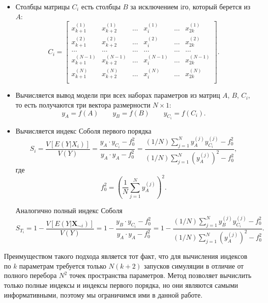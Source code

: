 \documentclass[a4paper,12pt]{article} %
\begin{document}
\begin{itemize}
\item Столбцы матрицы $C_i$ есть столбцы $B$ за исключением iго, который берется из $A$:
\begin{displaymath}
C_i=\begin{bmatrix}
x_{k+1}^{(1)} & x_{k+2}^{(1)} & \ldots & x_i^{(1)} & \ldots & x_{2k}^{(1)} \\
x_{k+1}^{(2)} & x_{k+2}^{(2)} & \ldots & x_i^{(2)} & \ldots & x_{2k}^{(2)} \\
\ldots & \ldots & \ldots & \ldots & \ldots & \ldots \\
x_{k+1}^{(N-1)} & x_{k+2}^{(N-1)} & \ldots & x_i^{(N-1)} & \ldots & x_{2k}^{(N-1)} \\
x_{k+1}^{(N)} & x_{k+2}^{(N)} & \ldots & x_i^{(N)} & \ldots & x_{2k}^{(N)} \\
\end{bmatrix}.
\end{displaymath}
\item Вычисляется вывод модели при всех наборах параметров из матриц $A$, $B$, $C_i$, то есть получаются три вектора размерности $N\times 1$:
\begin{displaymath}
y_A=f(A)\qquad y_B=f(B) \qquad y_{C_i}=f(C_i).
\end{displaymath} 
\item Вычисляется индекс Соболя первого порядка
\begin{displaymath}
S_i=\frac{V[E(Y|X_i)]}{V(Y)}=\frac{y_A\cdot y_{C_i}-f_0^2}{y_A\cdot y_A -f_0^2}=\frac{(1/N)\sum_{j=1}^N y_A^{(j)}y_{C_i}^{(j)} - f_0^2}{(1/N)\sum_{j=1}^N (y_A^{(j)})^2 - f_0^2},
\end{displaymath}
где
\begin{displaymath}
f_0^2=\left(\frac{1}{N}\sum\limits_{j=1}^N y_A^{(j)}\right)^2.
\end{displaymath}

Аналогично полный индекс Соболя
\begin{displaymath}
S_{T_i}=1-\frac{V[E(Y|\bm{X}_{\sim i})]}{V(Y)}=1-\frac{y_B\cdot y_{C_i}-f_0^2}{y_A\cdot y_A -f_0^2}=1-\frac{(1/N)\sum_{j=1}^N y_B^{(j)}y_{C_i}^{(j)} - f_0^2}{(1/N)\sum_{j=1}^N (y_A^{(j)})^2 - f_0^2}.
\end{displaymath}
\end{itemize}

Преимуществом такого подхода является тот факт, что для вычисления индексов по $k$ параметрам требуется только $N(k+2)$ запусков симуляции в отличие от полного перебора $N^2$ точек пространства параметров. Метод позволяет вычислить только полные индексы и индексы первого порядка, но они являются самыми информативными, поэтому мы ограничимся ими в данной работе.
\end{document}
